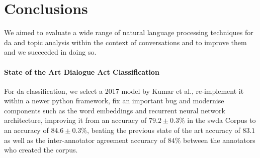 \chapter{Conclusions}
We aimed to evaluate a wide range of natural language processing techniques for \gls{da} and topic analysis within the context of conversations and to improve them and we succeeded in doing so.
\subsubsection{State of the Art Dialogue Act Classification}
    For \gls{da} classification, we select a 2017 \gls{model} by Kumar et al., re-implement it within a newer python framework, fix an important bug and modernise components such as the word \glspl{embedding} and recurrent neural network architecture, improving it from an accuracy of $79.2 \pm 0.3\%$ in the \gls{swda} Corpus to an accuracy of $84.6 \pm 0.3\%$, beating the previous state of the art accuracy of $83.1$ as well as the inter-annotator agreement accuracy of $84\%$ between the annotators who created the corpus.

